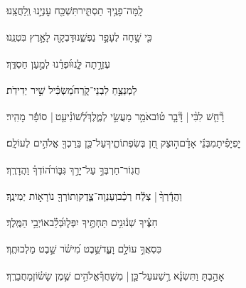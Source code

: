 \documentclass[12pt]{article}
\newcommand{\loc}[1]{\textsuperscript{\locf{#1}}}
\begin{document}
{\loc{ כה}~}‏לָֽמָּה־פָנֶ֥יךָ תַסְתִּ֑יר{\hfill}תִּשְׁכַּ֖ח עׇנְיֵ֣נוּ וְֽלַחֲצֵֽנוּ׃\par

{\loc{ כו}~}‏כִּ֤י שָׁ֣חָה לֶעָפָ֣ר נַפְשֵׁ֑נוּ{\hfill}דָּבְקָ֖ה לָאָ֣רֶץ בִּטְנֵֽנוּ׃\par

{\loc{ כז}~}‏ עֶזְרָ֣תָה לָּ֑נוּ{\hfill}וּ֝פְדֵ֗נוּ לְמַ֣עַן חַסְדֶּֽךָ׃\par\pend
\ledpb
\pstart[\subsection*{\textcolor{red}{פרק מה}}]\label{פרק מה}
{\loc{ א}~}‏לַמְנַצֵּ֣חַ \newline\hspace*{.5em}לִבְנֵי־קֹ֑רַח{\hfill}מַ֝שְׂכִּ֗יל שִׁ֣יר יְדִידֹֽת׃\par

{\loc{ ב}~}‏רָ֘חַ֤שׁ לִבִּ֨י |  דָּ֘בָ֤ר ט֗וֹב{\hfill}אֹמֵ֣ר  מַעֲשַׂ֣י לְמֶ֑לֶךְ\newline\hspace*{.5em}לְ֝שׁוֹנִ֗י{\hfill}עֵ֤ט |  סוֹפֵ֬ר מָהִֽיר׃\par

{\loc{ ג}~}‏יׇפְיָפִ֡יתָ{\hfill}מִבְּנֵ֬י אָדָ֗ם\newline\hspace*{.5em}ה֣וּצַק חֵ֭ן בְּשִׂפְתוֹתֶ֑יךָ{\hfill}עַל־כֵּ֤ן בֵּרַכְךָ֖ אֱלֹהִ֣ים לְעוֹלָֽם׃\par

{\loc{ ד}~}‏חֲגֽוֹר־חַרְבְּךָ֣ עַל־יָרֵ֣ךְ גִּבּ֑וֹר{\hfill}ה֝וֹדְךָ֗ וַהֲדָרֶֽךָ׃\par

{\loc{ ה}~}‏וַהֲדָ֬רְךָ֨ |  צְלַ֬ח רְכַ֗ב{\hfill}\newline\hspace*{.5em}וְעַנְוָה־צֶ֑דֶק{\hfill}וְתוֹרְךָ֖ נוֹרָא֣וֹת יְמִינֶֽךָ׃\par

{\loc{ ו}~}‏חִצֶּ֗יךָ שְׁנ֫וּנִ֥ים{\hfill} תַּחְתֶּ֣יךָ יִפְּל֑וּ\newline\hspace*{.5em}בְּ֝לֵ֗ב{\hfill}אוֹיְבֵ֥י הַמֶּֽלֶךְ׃\par

{\loc{ ז}~}‏כִּסְאֲךָ֣  עוֹלָ֣ם וָעֶ֑ד{\hfill}שֵׁ֥בֶט מִ֝ישֹׁ֗ר שֵׁ֣בֶט מַלְכוּתֶֽךָ׃\par

{\loc{ ח}~}‏אָהַ֣בְתָּ  וַתִּשְׂנָ֫א רֶ֥שַׁע{\hfill}עַל־כֵּ֤ן |  מְשָׁחֲךָ֡\newline\hspace*{.5em}אֱלֹהִ֣ים  שֶׁ֥מֶן שָׂשׂ֗וֹן{\hfill}מֵחֲבֵרֶֽךָ׃\par
\end{document}
